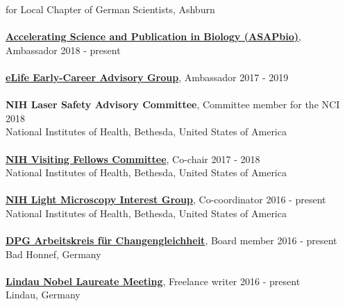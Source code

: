 \documentclass[margin,line]{res}
\begin{document}
\begin{resume}
for Local Chapter of German Scientists, Ashburn\\
\vspace*{-3mm}\\
{\bf \href{https://asapbio.org/preprint-info/preprint-stories}{Accelerating Science and Publication in Biology (ASAPbio)}}, Ambassador \hfill {2018 - present}\\
\vspace*{-3mm}\\
{\bf \href{hhttps://elifesciences.org/inside-elife/912b0679/early-career-advisory-group-elife-welcomes-150-ambassadors-of-good-practice-in-science}{eLife Early-Career Advisory Group}}, Ambassador \hfill {2017 - 2019}\\
\vspace*{-3mm}\\
{\bf NIH Laser Safety Advisory Committee}, Committee member for the NCI \hfill {2018}\\
National Institutes of Health, Bethesda, United States of America\\
\vspace*{-3mm}\\
{\bf \href{https://www.training.nih.gov/felcom/visitingfellows2}{NIH Visiting Fellows Committee}}, Co-chair \hfill {2017 - 2018}\\
National Institutes of Health, Bethesda, United States of America\\
\vspace*{-3mm}\\
{\bf \href{https://confocal.ccr.cancer.gov/light-microscopy-interest-group/}{ NIH Light Microscopy Interest Group}}, Co-coordinator \hfill {2016 - present}\\
National Institutes of Health, Bethesda, United States of America\\
\vspace*{-3mm}\\
{\bf  \href{https://www.dpg-physik.de/vereinigungen/fachuebergreifend/ak/akc}{DPG Arbeitskreis für Changengleichheit}}, Board member \hfill {2016 - present}\\
Bad Honnef, Germany\\
\vspace*{-3mm}\\
{\bf \href{https://www.lindau-nobel.org/blog-women-in-research-at-lino70/}{Lindau Nobel Laureate Meeting}}, Freelance writer \hfill {2016 - present}\\
Lindau, Germany\\
\vspace*{-3mm}\\

\end{resume}
\end{document}

